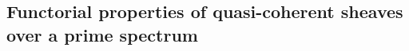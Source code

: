 \documentclass[../main.tex]{subfiles}
\begin{document}
\subsection{Functorial properties of quasi-coherent sheaves over a prime spectrum}

\end{document}
